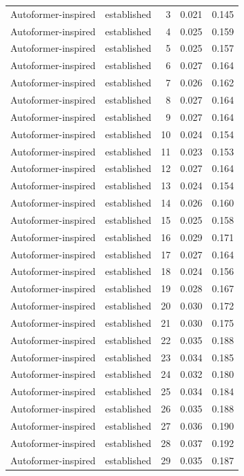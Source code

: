 \begin{tabular}{llrrr}
Autoformer-inspired & established & 3 & 0.021 & 0.145 \\
Autoformer-inspired & established & 4 & 0.025 & 0.159 \\
Autoformer-inspired & established & 5 & 0.025 & 0.157 \\
Autoformer-inspired & established & 6 & 0.027 & 0.164 \\
Autoformer-inspired & established & 7 & 0.026 & 0.162 \\
Autoformer-inspired & established & 8 & 0.027 & 0.164 \\
Autoformer-inspired & established & 9 & 0.027 & 0.164 \\
Autoformer-inspired & established & 10 & 0.024 & 0.154 \\
Autoformer-inspired & established & 11 & 0.023 & 0.153 \\
Autoformer-inspired & established & 12 & 0.027 & 0.164 \\
Autoformer-inspired & established & 13 & 0.024 & 0.154 \\
Autoformer-inspired & established & 14 & 0.026 & 0.160 \\
Autoformer-inspired & established & 15 & 0.025 & 0.158 \\
Autoformer-inspired & established & 16 & 0.029 & 0.171 \\
Autoformer-inspired & established & 17 & 0.027 & 0.164 \\
Autoformer-inspired & established & 18 & 0.024 & 0.156 \\
Autoformer-inspired & established & 19 & 0.028 & 0.167 \\
Autoformer-inspired & established & 20 & 0.030 & 0.172 \\
Autoformer-inspired & established & 21 & 0.030 & 0.175 \\
Autoformer-inspired & established & 22 & 0.035 & 0.188 \\
Autoformer-inspired & established & 23 & 0.034 & 0.185 \\
Autoformer-inspired & established & 24 & 0.032 & 0.180 \\
Autoformer-inspired & established & 25 & 0.034 & 0.184 \\
Autoformer-inspired & established & 26 & 0.035 & 0.188 \\
Autoformer-inspired & established & 27 & 0.036 & 0.190 \\
Autoformer-inspired & established & 28 & 0.037 & 0.192 \\
Autoformer-inspired & established & 29 & 0.035 & 0.187 \\

\end{tabular}
